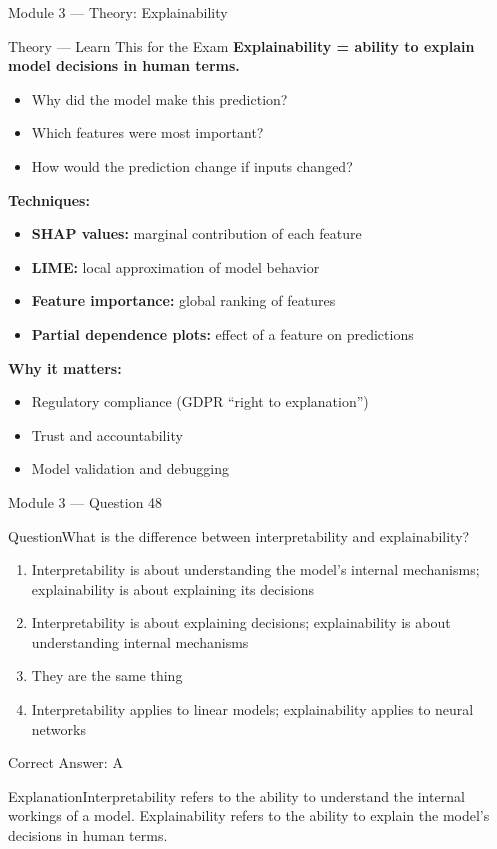 \documentclass[aspectratio=169,10pt]{beamer}
\newcommand{\question}[1]{\begin{block}{Question}#1\end{block}}
\newcommand{\options}[4]{%
	\begin{enumerate}[label=\Alph*.,leftmargin=*]
		\item #1
		\item #2
		\item #3
		\item #4
	\end{enumerate}
}
\newcommand{\answerbox}[1]{\begin{exampleblock}{Correct Answer: #1}\end{exampleblock}}
\newcommand{\explain}[1]{\begin{block}{Explanation}#1\end{block}}
\newcommand{\theory}[1]{%
	\begin{block}{Theory --- Learn This for the Exam}
		\small #1
	\end{block}
}
\begin{document}
	\begin{frame}{Module 3 --- Theory: Explainability}
		\theory{
			\textbf{Explainability = ability to explain model decisions in human terms.}
			\begin{itemize}
				\item Why did the model make this prediction?
				\item Which features were most important?
				\item How would the prediction change if inputs changed?
			\end{itemize}
			\textbf{Techniques:}
			\begin{itemize}
				\item \textbf{SHAP values:} marginal contribution of each feature
				\item \textbf{LIME:} local approximation of model behavior
				\item \textbf{Feature importance:} global ranking of features
				\item \textbf{Partial dependence plots:} effect of a feature on predictions
			\end{itemize}
			\textbf{Why it matters:}
			\begin{itemize}
				\item Regulatory compliance (GDPR ``right to explanation'')
				\item Trust and accountability
				\item Model validation and debugging
			\end{itemize}
		}
	\end{frame}
	
	\begin{frame}{Module 3 --- Question 48}
		\question{What is the difference between interpretability and explainability?}
		\options{Interpretability is about understanding the model's internal mechanisms; explainability is about explaining its decisions}{Interpretability is about explaining decisions; explainability is about understanding internal mechanisms}{They are the same thing}{Interpretability applies to linear models; explainability applies to neural networks}
		\answerbox{A}
		\explain{Interpretability refers to the ability to understand the internal workings of a model. Explainability refers to the ability to explain the model's decisions in human terms.}
	\end{frame}
	
\end{document}
